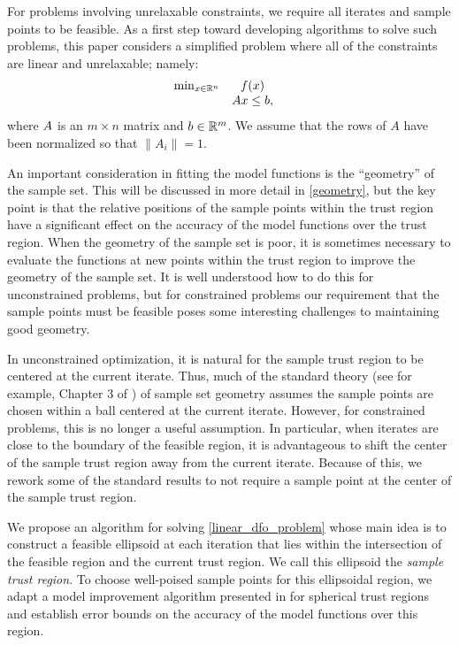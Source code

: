 \documentclass{article}
\begin{document}
For problems involving unrelaxable constraints,  we require all iterates and sample points to be feasible.
As a first step toward developing algorithms to solve such problems, this paper considers a simplified problem where all of the constraints are linear and unrelaxable; namely:
\begin{align}
\begin{array}{ccl} \min_{x \in \mathbb R^n} & f(x) \\
& {A} x \le {b}, & 
\end{array}
\label{linear_dfo_problem}
\end{align}
where ${A}$ is an $m \times n$ matrix and ${b} \in \mathbb R^m$.
We assume that the rows of $A$ have been normalized so that $\|A_i\| = 1$.


An important consideration in fitting the model functions is the ``geometry'' of the sample set.
This will be discussed in more detail in \cref{geometry}, but the key point is that the relative positions of the sample points within the trust region have a significant effect on the accuracy of the model functions over the trust region.
When the geometry of the sample set is poor, it is sometimes necessary to evaluate the functions at new points within the trust region to improve the geometry of the sample set.
It is well understood how to do this for unconstrained problems, but for constrained problems
our requirement that the sample points must be feasible poses some interesting challenges to maintaining good geometry.   

In unconstrained optimization, it is natural for the sample trust region to be centered at the current iterate.
Thus, much of the standard theory (see for example, Chapter 3 of \cite{introduction_book})
of sample set geometry assumes the sample points are chosen within a ball centered at the current iterate.
However, for constrained problems,  this is no longer a useful assumption.
In particular, when iterates are close to the boundary of the feasible region, it is advantageous to shift the center of the sample trust region away from the current iterate.
Because of this, we rework some of the standard results to not require a sample point at the center of the sample trust region.


We propose an algorithm for solving \cref{linear_dfo_problem} whose main idea is to construct a feasible ellipsoid at each iteration that lies within the intersection of the feasible region and the current trust region.   We call this ellipsoid the {\em sample trust region}.
To choose well-poised sample points for this ellipsoidal region,  we adapt a model improvement algorithm presented in \cite{introduction_book} for spherical trust regions and establish error bounds on the accuracy of the model functions over this region.    
\end{document}
